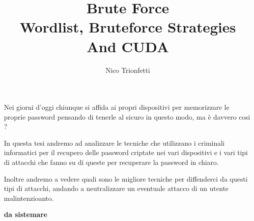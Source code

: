 \documentclass[a4paper]{unicam_thesis}
\title{Brute Force \\ Wordlist, Bruteforce Strategies And CUDA }
\author{Nico Trionfetti}%
\theoremstyle{definition} \newtheorem{esempio}{Esempio}[chapter]
\theoremstyle{definition}
\begin{document}
\maketitle


\tableofcontents

\abstract

Nei giorni d'oggi chiunque si affida ai propri dispositivi per memorizzare le proprie password pensando di tenerle al sicuro in questo modo, ma è davvero cosi ?

In questa tesi andremo ad analizzare le tecniche che utilizzano i criminali informatici per il recupero delle password criptate nei vari dispositivi e i vari tipi di attacchi che fanno su di queste per recuperare la password in chiaro.

Inoltre andremo a vedere quali sono le migliore tecniche per diffenderci da questi tipi di attacchi, andando a neutralizzare un eventuale attacco di un utente malintenzioanto.

\textbf{da sistemare} 











\lstlistoflistings
\listoffigures
\listoftables

\appendix
%
%
%

\printbibliography

\printindex


\end{document}
